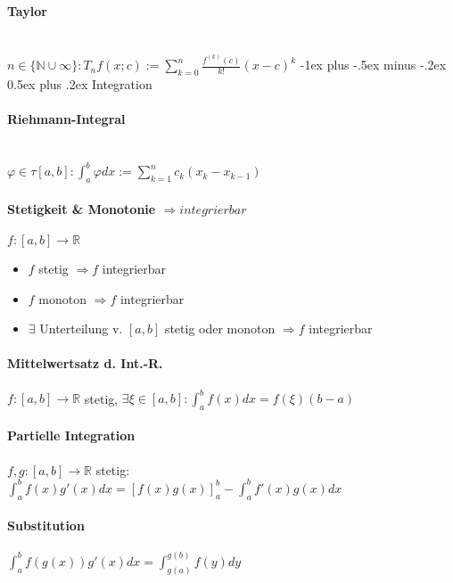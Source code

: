 \documentclass[paper=a3,paper=landscape, fontsize=9pt,DIV=30]{scrartcl}
\makeatletter
\newcommand{\real}{{\mathbb{R}}}
\newcommand{\nat}{\mathbb{N}}
\renewcommand{\section}{\@startsection{section}{1}{0mm}%
  {-1ex plus -.5ex minus -.2ex}%
  {0.5ex plus .2ex}%
  {\color{blue}\normalfont\large\bfseries}}
\makeatother
\begin{document}
\begin{multicols*}{4}
  \paragraph{Taylor}\hspace{0pt} \\
  $ n \in \{\nat \cup \infty\}: T_nf(x;c):= \sum_{k=0}^{n}\frac{f^{(k)}(c)}{k!}(x-c)^k$
  \section{Integration}


  \paragraph{Riehmann-Integral}\hspace{0pt} \\
  $\varphi \in \tau [a,b]: \int_{a}^{b}\varphi dx := \sum_{k=1}^{n}c_k(x_k-x_{k-1})$


  \paragraph{Stetigkeit \& Monotonie $\Rightarrow integrierbar$} $f: [a,b] \rightarrow \real$
  \begin{itemize}
  \item $f$ stetig $\Rightarrow f$ integrierbar
  \item $f$ monoton $\Rightarrow f$ integrierbar
  \item $\exists$ Unterteilung v. $[a,b]$ stetig oder monoton $\Rightarrow f$ integrierbar
  \end{itemize}


  \paragraph{Mittelwertsatz d. Int.-R.}
  $f:[a,b] \rightarrow \real$ stetig, $\exists \xi \in [a,b]: \int_{a}^{b}f(x)dx=f(\xi)(b-a)$


  \paragraph{Partielle Integration}
  $f,g: [a,b] \rightarrow \real$ stetig: $\int_{a}^{b}f(x)g'(x)dx=[f(x)g(x)]_a^b-\int_{a}^{b}f'(x)g(x) dx$


  \paragraph{Substitution}
  $\int_{a}^{b}f(g(x))g'(x)dx=\int_{g(a)}^{g(b)}f(y)dy$



\end{multicols*}
\end{document}
